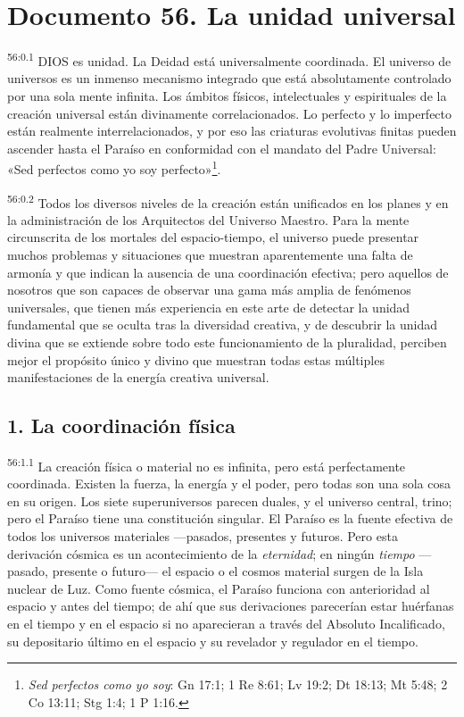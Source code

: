 \chapter{Documento 56. La unidad universal}
\par
\textsuperscript{56:0.1} DIOS es unidad. La Deidad está universalmente coordinada. El universo de universos es un inmenso mecanismo integrado que está absolutamente controlado por una sola mente infinita. Los ámbitos físicos, intelectuales y espirituales de la creación universal están divinamente correlacionados. Lo perfecto y lo imperfecto están realmente interrelacionados, y por eso las criaturas evolutivas finitas pueden ascender hasta el Paraíso en conformidad con el mandato del Padre Universal: «Sed perfectos como yo soy perfecto»\footnote{\textit{Sed perfectos como yo soy}: Gn 17:1; 1 Re 8:61; Lv 19:2; Dt 18:13; Mt 5:48; 2 Co 13:11; Stg 1:4; 1 P 1:16.}.

\par
\textsuperscript{56:0.2} Todos los diversos niveles de la creación están unificados en los planes y en la administración de los Arquitectos del Universo Maestro. Para la mente circunscrita de los mortales del espacio-tiempo, el universo puede presentar muchos problemas y situaciones que muestran aparentemente una falta de armonía y que indican la ausencia de una coordinación efectiva; pero aquellos de nosotros que son capaces de observar una gama más amplia de fenómenos universales, que tienen más experiencia en este arte de detectar la unidad fundamental que se oculta tras la diversidad creativa, y de descubrir la unidad divina que se extiende sobre todo este funcionamiento de la pluralidad, perciben mejor el propósito único y divino que muestran todas estas múltiples manifestaciones de la energía creativa universal.

\section*{1. La coordinación física}
\par
\textsuperscript{56:1.1} La creación física o material no es infinita, pero está perfectamente coordinada. Existen la fuerza, la energía y el poder, pero todas son una sola cosa en su origen. Los siete superuniversos parecen duales, y el universo central, trino; pero el Paraíso tiene una constitución singular. El Paraíso es la fuente efectiva de todos los universos materiales ---pasados, presentes y futuros. Pero esta derivación cósmica es un acontecimiento de la \textit{eternidad}; en ningún \textit{tiempo} ---pasado, presente o futuro--- el espacio o el cosmos material surgen de la Isla nuclear de Luz. Como fuente cósmica, el Paraíso funciona con anterioridad al espacio y antes del tiempo; de ahí que sus derivaciones parecerían estar huérfanas en el tiempo y en el espacio si no aparecieran a través del Absoluto Incalificado, su depositario último en el espacio y su revelador y regulador en el tiempo.


